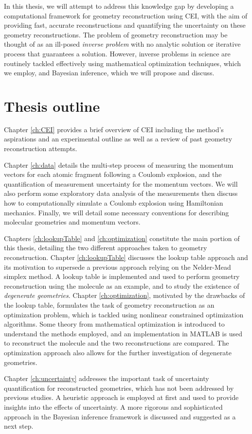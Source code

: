 In this thesis, we will attempt to address this knowledge gap by developing a computational framework for geometry reconstruction using CEI, with the aim of providing fast, accurate reconstructions and quantifying the uncertainty on these geometry reconstructions. The problem of geometry reconstruction may be thought of as an ill-posed \emph{inverse problem} with no analytic solution or iterative process that guarantees a solution. However, inverse problems in science are routinely tackled effectively using mathematical optimization techniques, which we employ, and Bayesian inference, which we will propose and discuss.

\section*{Thesis outline}
Chapter \ref{ch:CEI} provides a brief overview of CEI including the method's aspirations and an experimental outline as well as a review of past geometry reconstruction attempts.

Chapter \ref{ch:data} details the multi-step process of measuring the momentum vectors for each atomic fragment following a Coulomb explosion, and the quantification of measurement uncertainty for the momentum vectors. We will also perform some exploratory data analysis of the measurements then discuss how to computationally simulate a Coulomb explosion using Hamiltonian mechanics. Finally, we will detail some necessary conventions for describing molecular geometries and momentum vectors.

Chapters \ref{ch:lookupTable} and \ref{ch:optimization} constitute the main portion of this thesis, detailing the two different approaches taken to geometry reconstruction. Chapter \ref{ch:lookupTable} discusses the lookup table approach and its motivation to supersede a previous approach relying on the Nelder-Mead simplex method. A lookup table is implemented and used to perform geometry reconstruction using the  molecule as an example, and to study the existence of \emph{degenerate geometries}. Chapter \ref{ch:optimization}, motivated by the drawbacks of the lookup table, formulates the task of geometry reconstruction as an optimization problem, which is tackled using nonlinear constrained optimization algorithms. Some theory from mathematical optimization is introduced to understand the methods employed, and an implementation in MATLAB is used to reconstruct the  molecule and the two reconstructions are compared. The optimization approach also allows for the further investigation of degenerate geometries.

Chapter \ref{ch:uncertainty} addresses the important task of uncertainty quantification for reconstructed geometries, which has not been addressed by previous studies. A heuristic approach is employed at first and used to provide insights into the effects of uncertainty. A more rigorous and sophisticated approach in the Bayesian inference framework is discussed and suggested as a next step.
